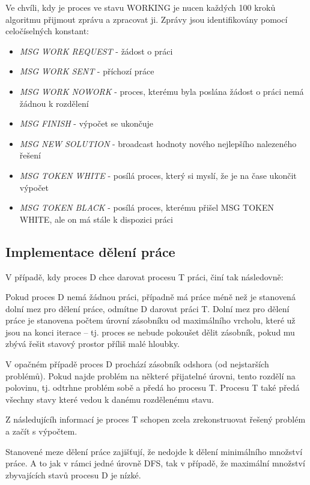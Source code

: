 \documentclass[]{article}
\begin{document}
Ve chvíli, kdy je proces ve stavu WORKING je nucen každých 100 kroků algoritmu přijmout zprávu a zpracovat ji. Zprávy jsou identifikovány pomocí celočíselných konstant:

\begin{itemize}
  \item \textit{MSG WORK REQUEST} - žádost o práci
  \item \textit{MSG WORK SENT} - příchozí práce
  \item \textit{MSG WORK NOWORK} - proces, kterému byla poslána žádost o práci nemá žádnou k rozdělení
  \item \textit{MSG FINISH} - výpočet se ukončuje
  \item \textit{MSG NEW SOLUTION} - broadcast hodnoty nového nejlepšího nalezeného řešení
  \item \textit{MSG TOKEN WHITE} - posílá proces, který si myslí, že je na čase ukončit výpočet
  \item \textit{MSG TOKEN BLACK } - posílá proces, kterému přišel MSG TOKEN WHITE, ale on má stále k dispozici práci
\end{itemize}

\subsection{Implementace dělení práce}
\label{deleni_prace}

V případě, kdy proces D chce darovat procesu T práci, činí tak následovně:

Pokud proces D nemá žádnou práci, případně má práce méně než je stanovená dolní mez pro dělení práce, odmítne D darovat práci T. Dolní mez pro dělení práce je stanovena počtem úrovní zásobníku od maximálního vrcholu, které už jsou na konci iterace -- tj. proces se nebude pokoušet dělit zásobník, pokud mu zbývá řešit stavový prostor příliš malé hloubky.

V opačném případě proces D prochází zásobník odshora (od nejstarších problémů). Pokud najde problém na některé přijatelné úrovni, tento rozdělí na polovinu, tj. odtrhne problém sobě a předá ho procesu T. Procesu T také předá všechny stavy které vedou k danému rozdělenému stavu.

Z následujícíh informací je proces T schopen zcela zrekonstruovat řešený problém a začít s výpočtem.

Stanovené meze dělení práce zajišťují, že nedojde k dělení minimálního množství práce. A to jak v rámci jedné úrovně DFS, tak v případě, že maximální množství zbyvajících stavů procesu D je nízké.
\end{document}
